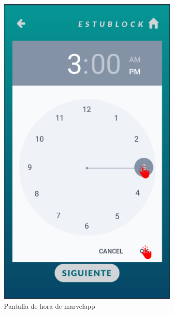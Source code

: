 \begin{figure}[hbt]
	\centering
	\begin{subfigure}[b]{0.4\linewidth}
		\centering
        \includegraphics[width=0.7\linewidth]{figs/Desarrollo/Interfaz/marvel_crear_evento_hora}
        \caption[Marvel Hora]{Pantalla de hora de marvelapp}
	\end{subfigure} 
	\begin{subfigure}[b]{0.4\linewidth}
		\centering

\end{subfigure}
\end{figure}
